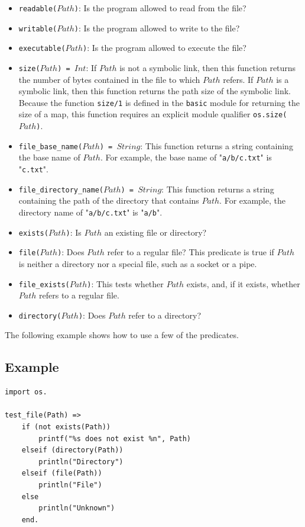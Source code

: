 \begin{itemize}
{}
\item \texttt{readable($Path$)}: Is the program allowed to read from the file?
\item \texttt{writable($Path$)}: Is the program allowed to write to the file?
\item \texttt{executable($Path$)}: Is the program allowed to execute the file?
\item \texttt{size($Path$) = $Int$}: If $Path$ is not a symbolic link, then this function returns the number of bytes contained in the file to which $Path$ refers.  If $Path$ is a symbolic link, then this function returns the path size of the symbolic link. Because the function {\tt size/1} is defined in the {\tt basic} module for returning the size of a map, this function requires an explicit module qualifier {\tt os.size($Path$)}.

\item \texttt{file\_base\_name($Path$) = $String$}: This function returns a string containing the base name of $Path$.  For example, the base name of "\texttt{a/b/c.txt}" is "\texttt{c.txt}".
\item \texttt{file\_directory\_name($Path$) = $String$}: This function returns a string containing the path of the directory that contains $Path$.  For example, the directory name of "\texttt{a/b/c.txt}" is "\texttt{a/b}".
\item \texttt{exists($Path$)}: Is $Path$ an existing file or directory?
\item \texttt{file($Path$)}: Does $Path$ refer to a regular file?  This predicate is true if $Path$ is neither a directory nor a special file, such as a socket or a pipe.
\item \texttt{file\_exists($Path$)}:  This tests whether $Path$ exists, and, if it exists, whether $Path$ refers to a regular file.
\item \texttt{directory($Path$)}: Does $Path$ refer to a directory?
\end{itemize}

The following example shows how to use a few of the predicates.

\subsection*{Example}
\begin{verbatim}
import os.

test_file(Path) =>
    if (not exists(Path))
        printf("%s does not exist %n", Path)
    elseif (directory(Path))
        println("Directory")
    elseif (file(Path))
        println("File")
    else
        println("Unknown")
    end.
\end{verbatim}

